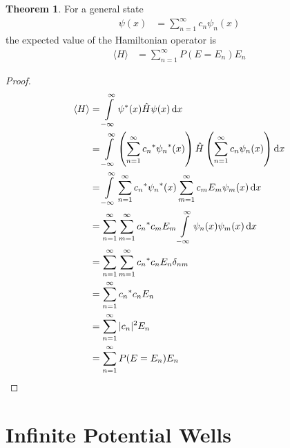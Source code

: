 \documentclass[titlepage, fleqn, a4paper, 12pt, twoside]{article}
\theoremstyle{definition}
\theoremstyle{theorem}
\newtheorem{theorem}{Theorem}
\begin{document}
\begin{theorem}
	For a general state
	\begin{align*}
		\psi(x) &= \sum\limits_{n = 1}^{\infty} c_n \psi_n(x)
	\end{align*}
	the expected value of the Hamiltonian operator is
	\begin{align*}
		\langle H \rangle &= \sum\limits_{n = 1}^{\infty} P(E = E_n) E_n
	\end{align*}
\end{theorem}

\begin{proof}
	\begin{align*}
		\langle H \rangle &= \int\limits_{-\infty}^{\infty} \psi^*(x) \hat{H} \psi(x) \dif x\\
		&= \int\limits_{-\infty}^{\infty} \left( \sum\limits_{n = 1}^{\infty} {c_n}^* {\psi_n}^*(x) \right) \hat{H} \left( \sum\limits_{n = 1}^{\infty} c_n \psi_n(x) \right) \dif x\\
		&= \int\limits_{-\infty}^{\infty} \sum\limits_{n = 1}^{\infty} {c_n}^* {\psi_n}^*(x) \sum\limits_{m = 1}^{\infty} c_m E_m \psi_m(x) \dif x\\
		&= \sum\limits_{n = 1}^{\infty} \sum\limits_{m = 1}^{\infty} {c_n}^* c_m E_m \int\limits_{-\infty}^{\infty} {\psi_n}(x) \psi_m(x) \dif x\\
		&= \sum\limits_{n = 1}^{\infty} \sum\limits_{m = 1}^{\infty} {c_n}^* c_n E_n \delta_{n m}\\
		&= \sum\limits_{n = 1}^{\infty} {c_n}^* c_n E_n\\
		&= \sum\limits_{n = 1}^{\infty} |c_n|^2 E_n\\
		&= \sum\limits_{n = 1}^{\infty} P(E = E_n) E_n
	\end{align*}
\end{proof}

\section{Infinite Potential Wells}
\end{document}
